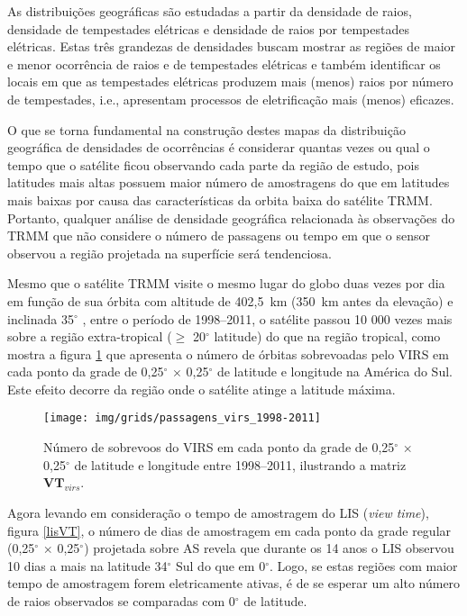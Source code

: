 As distribuições geográficas são estudadas a partir da densidade de raios, densidade de tempestades elétricas e densidade de raios por tempestades elétricas. Estas três grandezas de densidades buscam mostrar as regiões de maior e menor ocorrência de raios e de tempestades elétricas e também identificar os locais em que as tempestades elétricas produzem mais (menos) raios por número de tempestades, i.e., apresentam processos de eletrificação mais (menos) eficazes. 

O que se torna fundamental na construção destes mapas da distribuição geográfica de densidades de ocorrências é considerar quantas vezes ou qual o tempo que o satélite ficou observando cada parte da região de estudo, pois latitudes mais altas possuem maior número de amostragens do que em latitudes mais baixas por causa das características da orbita baixa do satélite TRMM. Portanto, qualquer análise de densidade geográfica relacionada às observações do TRMM que não considere o número de passagens ou tempo em que o sensor observou a região projetada na superfície será tendenciosa. 

Mesmo que o satélite TRMM visite o mesmo lugar do globo duas vezes por dia em função de sua órbita com altitude de 402,5~km (350~km antes da elevação) e inclinada 35$^{\circ}$ \cite{kummerok1998}, entre o período de 1998--2011, o satélite passou {10 000} vezes mais sobre a região extra-tropical ($\geq$ 20$^{\circ}$ latitude) do que na região tropical, como mostra a figura \ref{VirsVT} que apresenta o número de órbitas sobrevoadas pelo VIRS em cada ponto da grade de 0,25$^{\circ}$  $\times$ 0,25$^{\circ}$ de latitude e longitude na América do Sul. Este efeito decorre da região onde o satélite atinge a latitude máxima.

\begin{figure}[!hb]
  \centering
  {{\texttt{[image: img/grids/passagens\_virs\_1998-2011]}}}
\caption{Número de sobrevoos do VIRS em cada ponto da grade de 0,25$^{\circ}$  $\times$ 0,25$^{\circ}$ de latitude e longitude entre 1998--2011, ilustrando a matriz $\mathbf{VT}_{virs}$.}
\label{VirsVT}
\end{figure} 


Agora levando em consideração o tempo de amostragem do LIS (\textit{view time}), figura \ref{lisVT}, o número de dias de amostragem em cada ponto da grade regular (0,25$^{\circ}$  $\times$ 0,25$^{\circ}$) projetada sobre AS revela que durante os 14 anos o LIS observou 10 dias a mais na latitude 34$^{\circ}$ Sul do que em 0$^{\circ}$. Logo, se estas regiões com maior tempo de amostragem forem eletricamente ativas, é de se esperar um alto número de raios observados se comparadas com 0$^{\circ}$ de latitude.

